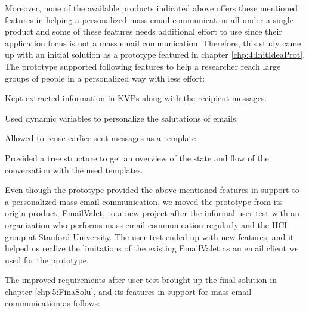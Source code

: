 Moreover, none of the available products indicated above offers these mentioned features in helping a personalized mass email communication all under a single product and some of these features needs additional effort to use since their application focus is not a mass email communication. Therefore, this study came up with an initial solution as a prototype featured in chapter \ref{chp:4:InitIdeaProt}. The prototype supported following features to help a researcher reach large groups of people in a personalized way with less effort:

\begin{compactitem}
	\item Kept extracted information in \ac{KVP}s along with the recipient messages.
	\item Used dynamic variables to personalize the salutations of emails.
	\item Allowed to reuse earlier sent messages as a template.
	\item Provided a tree structure to get an overview of the state and flow of the conversation with the used templates.
\end{compactitem}
\vspace{1cm}

Even though the prototype provided the above mentioned features in support to a personalized mass email communication, we moved the prototype from its origin product, EmailValet, to a new project after the informal user test with an organization who performs mass email communication regularly and the \ac{HCI} group at Stanford University. The user test ended up with new features, and it helped us realize the limitations of the existing EmailValet as an email client we used for the prototype.
\vspace{1cm}

The improved requirements after user test brought up the final solution in chapter \ref{chp:5:FinaSolu}, and its features in support for mass email communication as follows:


